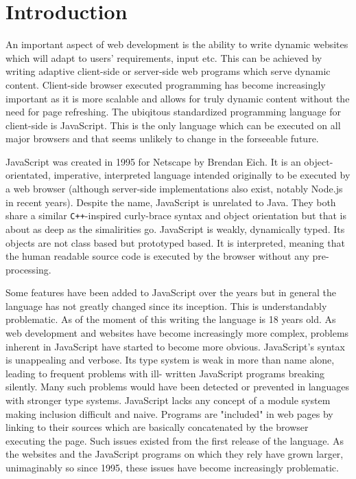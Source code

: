 \section{Introduction}
An important aspect of web development is the ability to write dynamic
websites which will adapt to users' requirements, input etc. This can be
achieved by writing adaptive client-side or server-side web programs
which serve dynamic content. Client-side browser executed programming 
has become  increasingly important as it is more scalable and allows 
for truly dynamic content without the need for page refreshing. The 
ubiqitous standardized programming language for client-side is JavaScript.
This is the only language which can be executed on all major browsers and 
that seems unlikely to change in the forseeable future. 

JavaScript was created in 1995 for Netscape by Brendan Eich. It is an
object-orientated, imperative, interpreted language intended originally
to be executed by a web browser (although server-side implementations
also exist, notably Node.js in recent years). Despite the name, JavaScript
is unrelated to Java. They both share a similar \verb!C++!-inspired
curly-brace syntax and object orientation but that is about as deep as
the simalirities go. JavaScript is weakly, dynamically typed. Its objects
are not class based but prototyped based. It is interpreted, meaning
that the human readable source code is executed by the browser without
any pre-processing. 

Some features have been added to JavaScript over the years but in 
general the language has not greatly changed since its inception. This
is understandably problematic. As of the moment of this writing the
language is 18 years old. 
As web development and websites have become increasingly more complex,
problems inherent in JavaScript have started to become more obvious.
JavaScript's syntax is unappealing and verbose. Its type system is 
weak in more than name alone, leading to frequent problems with ill-
written JavaScript programs breaking silently. Many such problems 
would have been detected or prevented in languages with stronger
type systems. JavaScript lacks any concept of a module system making
inclusion difficult and naive. Programs are "included" in web pages
by linking to their sources which are basically concatenated by the
browser executing the page. Such issues existed from the first 
release of the language. As the websites and the JavaScript
programs on which they rely have grown larger, unimaginably so since
1995, these issues have become increasingly problematic.

